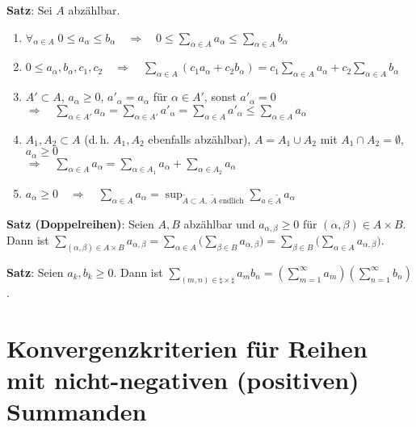 \textbf{Satz}: Sei $A$ abzählbar.
\begin{enumerate}
    \item $\forall_{\alpha \in A}\; 0 \le a_\alpha \le b_\alpha
    \quad\Rightarrow\quad
    0 \le \sum_{\alpha \in A} a_\alpha \le \sum_{\alpha \in A} b_\alpha$

    \item $0 \le a_\alpha, b_\alpha, c_1, c_2
    \quad\Rightarrow\quad
    \sum_{\alpha \in A} (c_1 a_\alpha + c_2 b_\alpha) =
    c_1 \sum_{\alpha \in A} a_\alpha + c_2 \sum_{\alpha \in A} b_\alpha$

    \item $A' \subset A$, \quad $a_\alpha \ge 0$, \quad
    $a'_\alpha = a_\alpha$ für $\alpha \in A'$,
    sonst $a'_\alpha = 0$ \\
    $\Rightarrow\quad \sum_{\alpha \in A'} a_\alpha
    = \sum_{\alpha \in A'} a'_\alpha
    = \sum_{\alpha \in A} a'_\alpha
    \le \sum_{\alpha \in A} a_\alpha$

    \item $A_1, A_2 \subset A$ (d.\,h. $A_1, A_2$ ebenfalls abzählbar), \quad
    $A = A_1 \cup A_2$ mit $A_1 \cap A_2 = \emptyset$, \quad
    $a_\alpha \ge 0$ \\
    $\Rightarrow\quad \sum_{\alpha \in A} a_\alpha =
    \sum_{\alpha \in A_1} a_\alpha + \sum_{\alpha \in A_2} a_\alpha$

    \item $a_\alpha \ge 0
    \quad\Rightarrow\quad \sum_{\alpha \in A} a_\alpha =
    \sup_{\widetilde{A} \subset A,\; \widetilde{A} \text{ endlich}}
    \sum_{a \in \widetilde{A}} a_\alpha$
\end{enumerate}

\linie

\textbf{Satz (Doppelreihen)}:
Seien $A, B$ abzählbar und $a_{\alpha,\beta} \ge 0$ für
$(\alpha,\beta) \in A \times B$. \\
Dann ist $\sum_{(\alpha,\beta) \in A \times B} a_{\alpha,\beta} =
\sum_{\alpha \in A} \Big(\sum_{\beta \in B} a_{\alpha,\beta}\Big) =
\sum_{\beta \in B} \Big(\sum_{\alpha \in A} a_{\alpha,\beta}\Big)$.

\textbf{Satz}:
Seien $a_k, b_k \ge 0$.
Dann ist $\sum_{(m,n) \in \natural \times \natural} a_m b_n =
\left(\sum_{m=1}^\infty a_m\right) \left(\sum_{n=1}^\infty b_n\right)$.

\section{%
    Konvergenzkriterien für Reihen mit nicht-negativen (positiven)
    Summanden%
}

